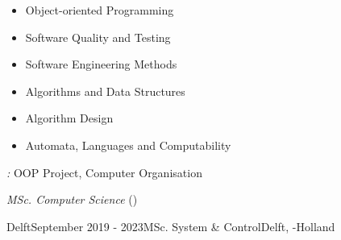 \begin{rSection}{}
  \begin{center}
  \begin{minipage}{0.45\textwidth}
  \begin{itemize}
    \item Object-oriented Programming\\[-3ex]
    \item Software Quality and Testing\\[-3ex]
    \item Software Engineering Methods\\[-3ex]
  \end{itemize}
  \end{minipage}
  \begin{minipage}{0.45\textwidth}
  \begin{itemize}
    \item Algorithms and Data Structures\\[-3ex]
    \item Algorithm Design\\[-3ex]
    \item Automata, Languages and Computability\\[-3ex]
  \end{itemize}
  \end{minipage}
  \end{center}
  \vspace{0.3cm}

  \textit{:}\hspace{0.2cm} OOP Project, Computer Organisation\\
  \vspace{-0.5cm}

  \noindent\textit{ MSc. Computer Science}\hspace{0.1cm} ()

  \begin{experienceItem}
    { Delft}{September 2019 -  2023}{MSc. System \& Control}{Delft, -Holland}
  \end{experienceItem}


\end{rSection}
